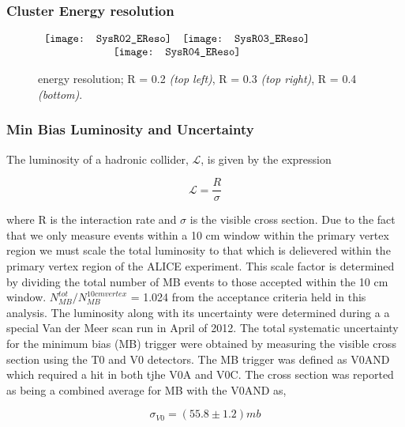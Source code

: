 \subsubsection{Cluster Energy resolution}

\begin{figure*}[t!]
$\begin{array}{rl}
    \texttt{[image: SysR02\_EReso]} &
    \texttt{[image: SysR03\_EReso]}\\
    \multicolumn{2}{c}{\texttt{[image: SysR04\_EReso]}}
\end{array}$
\caption[Systematic due to energy resolution.]{\label{fig:pTeff}energy resolution; R = 0.2 \textit{(top left)}, R = 0.3 \textit{(top right)}, R = 0.4 \textit{(bottom)}.}
\end{figure*}

\subsubsection{Min Bias Luminosity and Uncertainty}

The luminosity of a hadronic collider, $\mathscr{L}$, is given by the expression



\begin{equation}
\mathscr{L} = \frac{R}{\sigma}
\label{eq:xlumdef}
\end{equation}

\noindent
where R is the interaction rate and $\sigma$ is the visible cross section.  Due to the fact that we only measure events within a 10 cm window within the primary vertex region we must scale the total luminosity to that which is delievered within the primary vertex region of the ALICE experiment.  This scale factor is determined by dividing the total number of MB events to those accepted within the 10 cm window.  $N^{tot}_{MB} / N^{10 cm vertex}_{MB}$ = 1.024 from the acceptance criteria held in this analysis.
The luminosity along with its uncertainty were determined during a a special Van der Meer scan run in April of 2012\cite{ALICE-PUBLIC-2017-002}.  The total systematic uncertainty for the minimum bias (MB) trigger were obtained by measuring the visible cross section using the T0 and V0 detectors.  The MB trigger was defined as V0AND which required a hit in both tjhe V0A and V0C.  The cross section was reported as being a combined average for MB with the V0AND as, 

\begin{equation}
\sigma_{V0} = (55.8 \pm 1.2) mb
\label{eq:xlumdef}
\end{equation}

